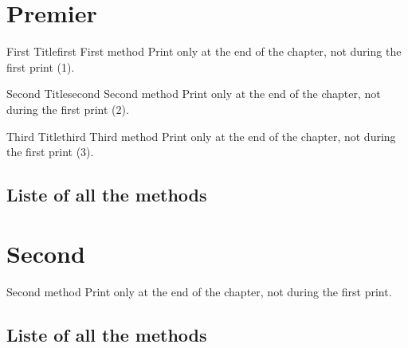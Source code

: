 \documentclass[10pt,a4paper,french]{book}
\makeatletter
\newcounter{tcb@cnt@meth}[chapter]
\makeatother
\begin{document}
\chapter{Premier}

\tcbstartrecording\relax

\begin{meth}{First Title}{first}
First method
\tcblower
Print only at the end of the chapter, not during the first print (1).
\end{meth}

\begin{meth}[first use=title]{Second Title}{second}
Second method
\tcblower
Print only at the end of the chapter, not during the first print (2).
\end{meth}

\begin{meth}{Third Title}{third}
Third method
\tcblower
Print only at the end of the chapter, not during the first print (3).
\end{meth}

\section*{Liste of all the methods}

\tcbstoprecording
\setcounter{tcb@cnt@meth}{0}
\tcbinputrecords

\chapter{Second}

\tcbstartrecording\relax

\begin{meth}{}{}
Second method
\tcblower
Print only at the end of the chapter, not during the first print.
\end{meth}

\section*{Liste of all the methods}

\tcbstoprecording
\setcounter{tcb@cnt@meth}{0}
\tcbinputrecords
\end{document}
